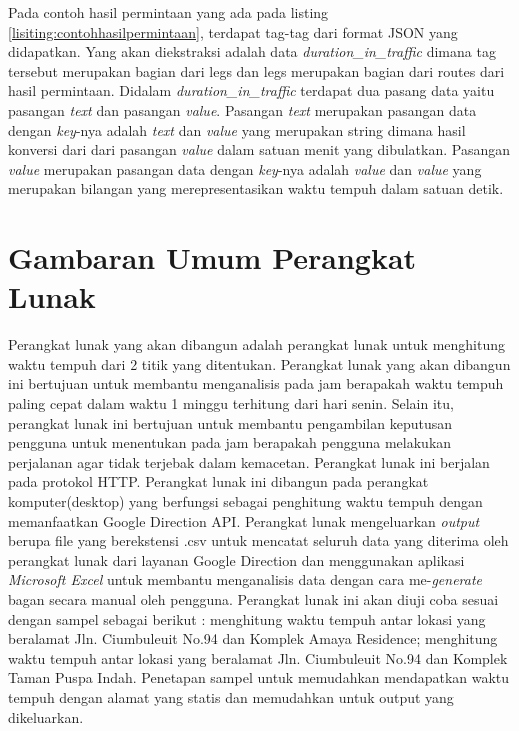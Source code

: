 Pada contoh hasil permintaan yang ada pada listing \ref{lisiting:contohhasilpermintaan}, terdapat tag-tag dari format JSON yang didapatkan. Yang akan diekstraksi adalah data \textit{duration\_in\_traffic} dimana tag tersebut merupakan bagian dari legs dan legs merupakan bagian dari routes dari hasil permintaan. Didalam \textit{duration\_in\_traffic} terdapat dua pasang data yaitu pasangan \textit{text} dan pasangan \textit{value}. Pasangan \textit{text} merupakan pasangan data dengan \textit{key}-nya adalah \textit{text} dan \textit{value} yang merupakan string dimana hasil konversi dari dari pasangan \textit{value} dalam satuan menit yang dibulatkan. Pasangan \textit{value} merupakan pasangan data dengan \textit{key}-nya adalah \textit{value} dan \textit{value} yang merupakan bilangan yang merepresentasikan waktu tempuh dalam satuan detik.

\section{Gambaran Umum Perangkat Lunak}
\label{sec:gambaranumum}

Perangkat lunak yang akan dibangun adalah perangkat lunak untuk menghitung waktu tempuh dari 2 titik yang ditentukan. Perangkat lunak yang akan dibangun ini bertujuan untuk membantu menganalisis pada jam berapakah waktu tempuh paling cepat dalam waktu 1 minggu terhitung dari hari senin. Selain itu, perangkat lunak ini bertujuan untuk membantu pengambilan keputusan pengguna untuk menentukan pada jam berapakah pengguna melakukan perjalanan agar tidak terjebak dalam kemacetan. Perangkat lunak ini berjalan pada protokol HTTP. Perangkat lunak ini dibangun pada perangkat komputer(desktop) yang berfungsi sebagai penghitung waktu tempuh dengan memanfaatkan Google Direction API. Perangkat lunak mengeluarkan \textit{output} berupa file yang berekstensi .csv untuk mencatat seluruh data yang diterima oleh perangkat lunak dari layanan Google Direction dan menggunakan aplikasi \textit{Microsoft Excel} untuk membantu menganalisis data dengan cara me-\textit{generate} bagan secara manual oleh pengguna.
Perangkat lunak ini akan diuji coba sesuai dengan sampel sebagai berikut : menghitung  waktu tempuh antar lokasi yang beralamat Jln. Ciumbuleuit No.94 dan Komplek Amaya Residence; menghitung  waktu tempuh antar lokasi yang beralamat Jln. Ciumbuleuit No.94 dan Komplek Taman Puspa Indah. Penetapan sampel untuk memudahkan mendapatkan waktu tempuh dengan alamat yang statis dan memudahkan untuk output yang dikeluarkan.
						
